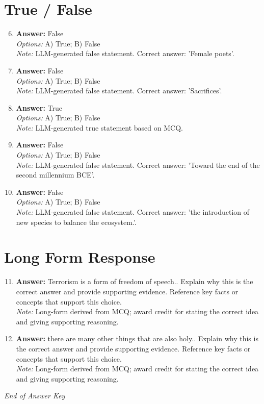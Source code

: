\documentclass[12pt]{article}
\begin{document}
\section*{True / False}
\begin{enumerate}[label=\arabic*.]
\setcounter{enumi}{5}
\item \textbf{Answer:} False
\\ \textit{Options:} A) True; B) False
\\ \textit{Note:} LLM-generated false statement. Correct answer: 'Female poets'.
\item \textbf{Answer:} False
\\ \textit{Options:} A) True; B) False
\\ \textit{Note:} LLM-generated false statement. Correct answer: 'Sacrifices'.
\item \textbf{Answer:} True
\\ \textit{Options:} A) True; B) False
\\ \textit{Note:} LLM-generated true statement based on MCQ.
\item \textbf{Answer:} False
\\ \textit{Options:} A) True; B) False
\\ \textit{Note:} LLM-generated false statement. Correct answer: 'Toward the end of the second millennium BCE'.
\item \textbf{Answer:} False
\\ \textit{Options:} A) True; B) False
\\ \textit{Note:} LLM-generated false statement. Correct answer: 'the introduction of new species to balance the ecosystem.'.
\end{enumerate}

\section*{Long Form Response}
\begin{enumerate}[label=\arabic*.]
\setcounter{enumi}{10}
\item \textbf{Answer:} Terrorism is a form of freedom of speech.. Explain why this is the correct answer and provide supporting evidence. Reference key facts or concepts that support this choice.
\\ \textit{Note:} Long-form derived from MCQ; award credit for stating the correct idea and giving supporting reasoning.
\item \textbf{Answer:} there are many other things that are also holy.. Explain why this is the correct answer and provide supporting evidence. Reference key facts or concepts that support this choice.
\\ \textit{Note:} Long-form derived from MCQ; award credit for stating the correct idea and giving supporting reasoning.
\end{enumerate}

\vfill
\noindent\textit{End of Answer Key}
\end{document}
